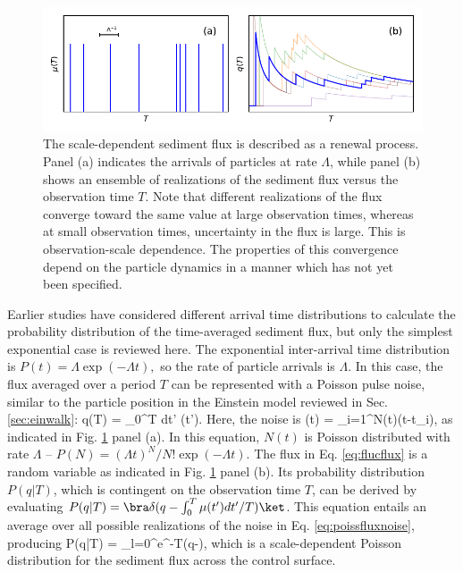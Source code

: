  \begin{figure}[!htbp]
	\includegraphics[width=\linewidth,keepaspectratio]{./figures/ch1/anceyRenewal.pdf}
	\caption{The scale-dependent sediment flux is described as a renewal process. Panel (a) indicates the arrivals of particles at rate $\Lambda$, while panel (b) shows an ensemble of realizations of the sediment flux versus the observation time $T$. Note that different realizations of the flux converge toward the same value at large observation times, whereas at small observation times, uncertainty in the flux is large. This is observation-scale dependence. The properties of this convergence depend on the particle dynamics in a manner which has not yet been specified. }
	\label{fig:ancey}
\end{figure}
Earlier studies have considered different arrival time distributions to calculate the probability distribution of the time-averaged sediment flux, but only the simplest exponential case is reviewed here. The exponential inter-arrival time distribution is $P(t) = \Lambda \exp(-\Lambda t),$ so the rate of particle arrivals is $\Lambda$.
In this case, the flux averaged over a period $T$ can be represented with a Poisson pulse noise, similar to the particle position in the Einstein model reviewed in Sec. \ref{sec:einwalk}:
\be q(T) = \int_0^T dt' \mu(t'). \label{eq:flucflux}\ee
Here, the noise is 
\be \mu(t) = \sum_{i=1}^{N(t)}\delta(t-t_i), \label{eq:poissfluxnoise}\ee
as indicated in Fig. \ref{fig:ancey} panel (a). In this equation, $N(t)$ is Poisson distributed with rate $\Lambda$ -- $P(N)=(\Lambda t)^N/N! \exp(-\Lambda t).$
The flux in Eq. \ref{eq:flucflux} is a random variable as indicated in Fig. \ref{fig:ancey} panel (b). Its probability distribution $P(q|T)$, which is contingent on the observation time $T$, can be derived by evaluating $P(q|T) = \bra \delta(q-\int_0^T \mu(t') dt'/T) \ket$.
This equation entails an average over all possible realizations of the noise in Eq. \ref{eq:poissfluxnoise}, producing \citep{VanKampen2007}
\be P(q|T) = \sum_{l=0}^\infty {}e^{-\Lambda T}\delta(q-),\ee
which is a scale-dependent Poisson distribution for the sediment flux across the control surface.

